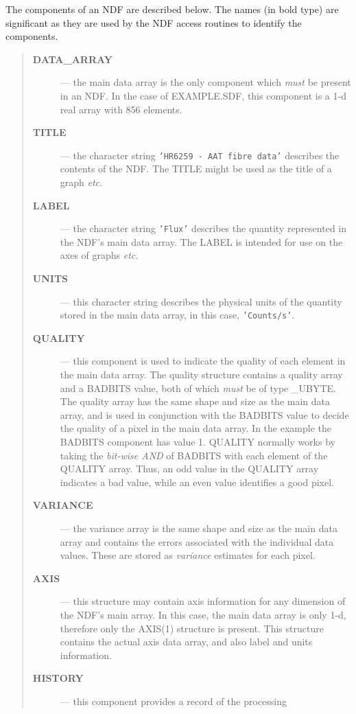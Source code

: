 The components of an NDF are described below.
The names (in bold type) are significant as they are used by the NDF
access routines to identify the components.

\begin{quote}
\begin{description}

\item[{\bf DATA\_ARRAY}] --- the main data array is the only component which
 {\em must} be present in an NDF.
 In the case of EXAMPLE.SDF, this component is a 1-d real array with 856
 elements.
\item[{\bf TITLE}] --- the  character string {\tt'HR6259 - AAT fibre data'}
 describes the contents of the NDF.
 The TITLE might be used as the title of a graph {\it etc.}
\item[{\bf LABEL}] --- the character string {\tt'Flux'} describes the
 quantity represented in the NDF's main data array.
 The LABEL is intended for use on the axes of graphs {\it etc.}
\item[{\bf UNITS}] --- this character string describes the physical units of
 the quantity stored in the main data array, in this case, {\tt'Counts/s'}.
\item[{\bf QUALITY}] --- this component is used to indicate the quality of
 each element in the main data array.
 The quality structure contains a quality array and a BADBITS value, both of
 which {\sl must\/} be of type \_UBYTE.
 The quality array has the same shape and size as the main data array, and is
 used in conjunction with the BADBITS value to decide the quality of a pixel
 in the main data array.
 In the example the BADBITS component has value 1.
 QUALITY normally works by taking the {\em bit-wise AND} of BADBITS with
 each element of the QUALITY array.
 Thus, an odd value in the QUALITY array indicates a bad value, while an even
 value identifies a good pixel.
\item[{\bf VARIANCE}] --- the variance array is the same shape and size as the
 main data array and contains the errors associated with the individual data
 values.
 These are stored as {\sl variance\/} estimates for each pixel.
\item[{\bf AXIS}] --- this structure may contain axis information for any
 dimension of the NDF's main array.
 In this case, the main data array is only 1-d, therefore only the AXIS(1)
 structure is present.
 This structure contains the actual axis data array, and also label and units
 information.
\item[{\bf HISTORY}] --- this component provides a record of the processing

\end{description}
\end{quote}
